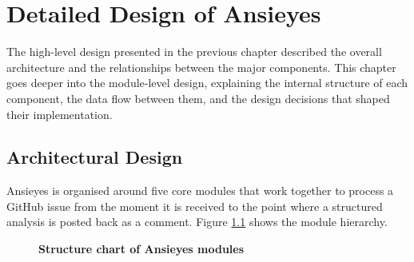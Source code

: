 \chapter{Detailed Design of Ansieyes}

The high-level design presented in the previous chapter described the overall architecture and the relationships between the major components. This chapter goes deeper into the module-level design, explaining the internal structure of each component, the data flow between them, and the design decisions that shaped their implementation.

\section{Architectural Design}

Ansieyes is organised around five core modules that work together to process a GitHub issue from the moment it is received to the point where a structured analysis is posted back as a comment. Figure \ref{fig:structure_chart} shows the module hierarchy.

\begin{figure}[htb]
\centering
{}
\caption[Structure chart of Ansieyes modules]{\textbf{Structure chart of Ansieyes modules}}
\label{fig:structure_chart}
\end{figure}

